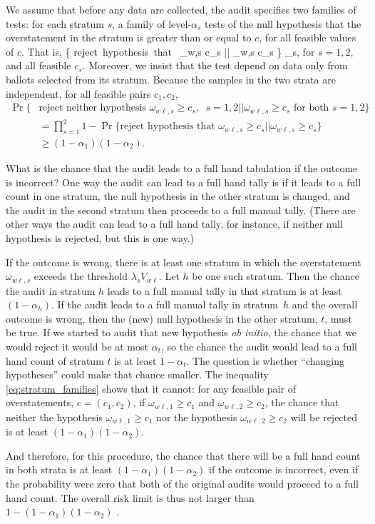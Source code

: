 We assume that before any data are collected, the audit specifies two families of tests:
for each stratum $s$, a family of level-$\alpha_s$ tests of the null hypothesis that 
the overstatement in the stratum is greater than or equal to $c$, for all feasible values of $c$.
That is,
\beq
    \Pr \{ \mbox{reject hypothesis that } \omega_{w\ell,s} \ge 
    c_s || \omega_{w\ell,s} \ge c_s \} \le \alpha_s,
\eeq
for $s = 1, 2$, and all feasible $c_s$.
Moreover, we insist that the test depend on data only from ballots selected from its stratum.
Because the samples in the two strata are independent, for all feasible pairs $c_1, c_2$,
\begin{align} \label{eq:stratum_families}
    \Pr\{&\mbox{reject neither hypothesis } \omega_{w\ell,s} \ge c_s, \;\; s=1, 2 ||
       \omega_{w\ell,s} \ge c_s  \mbox{ for both } s=1, 2 \} \nonumber \\ 
       &= \prod_{s=1}^2 1 - \Pr \{ \mbox{reject hypothesis that } \omega_{w\ell,s} \ge c_s || \omega_{w\ell,s} \ge c_s \} \nonumber \\
       & \ge (1-\alpha_1)(1-\alpha_2).
\end{align}

What is the chance that the audit leads to a full hand tabulation if the outcome is incorrect?
One way the audit can lead to a full hand tally is if it leads to a full count in one stratum, 
the null hypothesis in the other stratum is changed, and the audit in the second 
stratum then proceeds to a full manual tally.
(There are other ways the audit can lead to a full hand tally, for instance, if neither
null hypothesis is rejected, but this is one way.)

If the outcome is wrong, there is at least one stratum in which the overstatement 
$\omega_{w\ell,s}$ 
exceeds the threshold $\lambda_s V_{w\ell}$.
Let $h$ be one such stratum. 
Then the chance the audit in stratum $h$ leads to a full manual tally in that stratum
is at least $(1-\alpha_h)$.
If the audit leads to a full manual tally in stratum~$h$ and the overall outcome is wrong,
then the (new) null hypothesis in the other stratum, $t$, must be true.
If we started to audit that new hypothesis \emph{ab initio}, the chance that we would reject it
would be at most $\alpha_t$, so the chance the audit would lead to a full hand count 
of stratum $t$ is at least $1-\alpha_t$.
The question is whether ``changing hypotheses'' could make that chance smaller.
The inequality \ref{eq:stratum_families} shows that it cannot: for any feasible pair of
overstatements, $c = (c_1, c_2)$, if $\omega_{w\ell,1} \ge c_1$ and $\omega_{w\ell,2} \ge c_2$,
the chance that neither the hypothesis $\omega_{w\ell,1} \ge c_1$ nor the hypothesis 
$\omega_{w\ell,2} \ge c_2$ will be rejected is at least $(1-\alpha_1)(1-\alpha_2)$.

And therefore, for this procedure, the chance that there will be a full hand count in both strata is at least 
$(1-\alpha_1)(1-\alpha_2)$ if the outcome is incorrect,
even if the probability were zero that both of the original audits would proceed to a full hand count.
The overall risk limit is thus not larger than $1 - (1-\alpha_1)(1-\alpha_2)$
.
